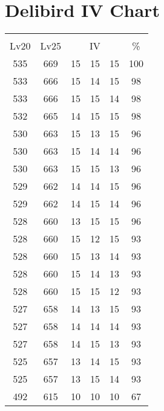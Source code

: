 \documentclass{article}%
\begin{document}
%
\normalsize%
\section{Delibird IV Chart}%
\label{sec:Delibird IV Chart}%
\renewcommand{\arraystretch}{1.5}%
\begin{tabular}{|c|c|c|c|c|c|}%
\hline%
\multicolumn{6}{|c|}{\textcolor{white}{ 
\linebreak{Delibird}
}%
\cellcolor{black}}\\%
\multicolumn{1}{|c}{Lv20}&\multicolumn{1}{c|}{Lv25}&\multicolumn{3}{c|}{IV}&\multicolumn{1}{|c|}{\%}\\%
\hline%
\rowcolor{color100}%
535&669&15&15&15&100\\%
\hline%
\rowcolor{color98}%
533&666&15&14&15&98\\%
\hline%
\rowcolor{color98}%
533&666&15&15&14&98\\%
\hline%
\rowcolor{color98}%
532&665&14&15&15&98\\%
\hline%
\rowcolor{color96}%
530&663&15&13&15&96\\%
\hline%
\rowcolor{color96}%
530&663&15&14&14&96\\%
\hline%
\rowcolor{color96}%
530&663&15&15&13&96\\%
\hline%
\rowcolor{color96}%
529&662&14&14&15&96\\%
\hline%
\rowcolor{color96}%
529&662&14&15&14&96\\%
\hline%
\rowcolor{color96}%
528&660&13&15&15&96\\%
\hline%
\rowcolor{color93}%
528&660&15&12&15&93\\%
\hline%
\rowcolor{color93}%
528&660&15&13&14&93\\%
\hline%
\rowcolor{color93}%
528&660&15&14&13&93\\%
\hline%
\rowcolor{color93}%
528&660&15&15&12&93\\%
\hline%
\rowcolor{color93}%
527&658&14&13&15&93\\%
\hline%
\rowcolor{color93}%
527&658&14&14&14&93\\%
\hline%
\rowcolor{color93}%
527&658&14&15&13&93\\%
\hline%
\rowcolor{color93}%
525&657&13&14&15&93\\%
\hline%
\rowcolor{color93}%
525&657&13&15&14&93\\%
\hline%
\rowcolor{color91}%
492&615&10&10&10&67\\%
\end{tabular}

%
\end{document}
